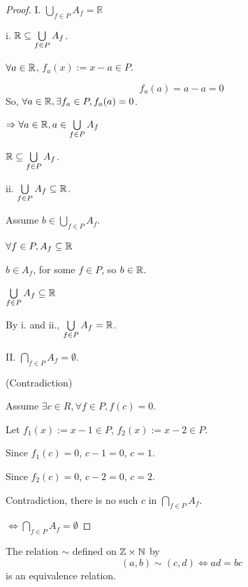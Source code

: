 \documentclass[12pt]{article}
\begin{document}
\begin{proof}
I. $\bigcup\limits_{f \in P} A_{f}=\mathbb{R}$

i. $\mathbb{R} \subseteq \bigcup\limits_{f \in P} A_{f}$.

$\forall a \in \mathbb{R}$, 
$f_a(x) := x - a \in P$.

\[
f_a(a) = a-a = 0
\]
So, $\forall a \in \mathbb{R}, \exists f_a \in P, f_a(a) = 0$.

$\Rightarrow \forall a\in \mathbb{R},a \in \bigcup\limits_{f \in P} A_{f}$

$\mathbb{R} \subseteq \bigcup\limits_{f \in P} A_{f}$.

ii. $\bigcup\limits_{f \in P} A_{f} \subseteq \mathbb{R} $.

Assume $b \in \bigcup\limits_{f \in P} A_{f}$.

$\forall f \in P, A_f \subseteq \mathbb{R}$

$b \in A_f$, for some $f\in P$, so $b \in \mathbb{R}$.

$\bigcup\limits_{f \in P} A_{f} \subseteq \mathbb{R} $

By i. and ii., $\bigcup\limits_{f \in P} A_{f} = \mathbb{R} $.

II. $\bigcap\limits_{f \in P}
A_{f}=\emptyset$.

(Contradiction)

Assume $\exists c \in R, \forall f \in P, f(c) = 0$.

Let $f_1(x) :=x-1 \in P$, $f_2(x) :=x-2 \in P$.

Since $f_1(c) = 0$, $c-1=0$, $c=1$.

Since $f_2(c) = 0$, $c-2=0$, $c=2$.

Contradiction, there is no such $c$ in $\bigcap\limits_{f \in P}
A_{f}$.

$\iff \bigcap\limits_{f \in P}
A_{f} = \emptyset$
\end{proof}
\vfill
\begin{Lemma}
The relation $\sim$ defined on $\mathbb{Z}\times \mathbb{N}$ by
\[(a,b)\sim (c,d)\iff ad = bc\]
is an equivalence relation.
\end{Lemma}
\end{document}
